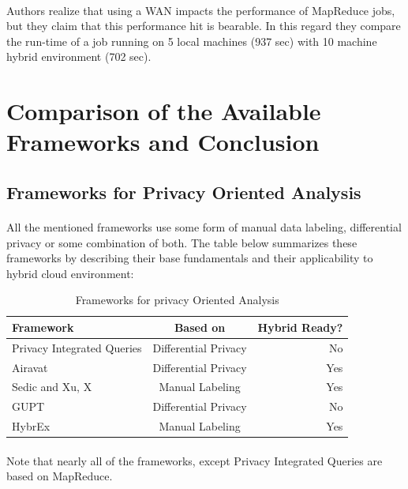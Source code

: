 \documentclass[12pt]{report}
\theoremstyle{named}
\begin{document}
\paragraph{}
Authors realize that using a WAN impacts the performance of MapReduce jobs, but they claim that this performance hit is bearable. In this regard they compare the run-time of a job running on 5 local machines (937 sec) with 10 machine hybrid environment (702 sec).

\section{Comparison of the Available Frameworks and Conclusion}
\subsection{Frameworks for Privacy Oriented Analysis}
\paragraph{}
All the mentioned frameworks use some form of manual data labeling, differential privacy or some combination of both. The table below summarizes these frameworks by describing their base fundamentals and their applicability to hybrid cloud environment:



\begin{table}[ht]
\centering
\begin{tabular}{@{}lcr@{}}
\toprule
\textbf{Framework} & \multicolumn{1}{c}{\textbf{Based on}} & \textbf{Hybrid Ready?} \\ \midrule
Privacy Integrated Queries \cite{mcsherry2009privacy} & Differential Privacy & No \\
Airavat \cite{roy2010airavat} & Differential Privacy & Yes \\
Sedic \cite{zhang2011sedic} and Xu, X \cite{xu2015framework} & Manual Labeling & Yes \\
GUPT \cite{mohan2012gupt} & Differential Privacy & No \\
HybrEx \cite{ko2011hybrex} & Manual Labeling & Yes \\ \bottomrule
\end{tabular}
\caption{Frameworks for privacy Oriented Analysis}
\label{Frameworks for privacy Oriented Analysis}
\end{table}




\paragraph{}
Note that nearly all of the frameworks, except Privacy Integrated Queries are based on MapReduce.
\end{document}
